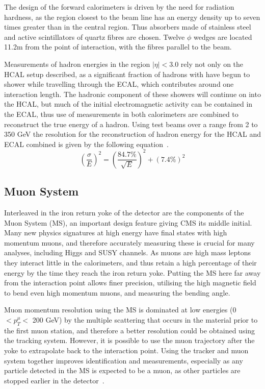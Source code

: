 The design of the forward calorimeters is driven by the need for radiation hardness, as the region closest to the beam line has an energy density up to seven times greater than in the central region. Thus absorbers made of stainless steel and active scintillators of quartz fibres are chosen. Twelve $\phi$ wedges are located 11.2m from the point of interaction, with the fibres parallel to the beam.

Measurements of hadron energies in the region $| \eta| < 3.0$ rely not only on the HCAL setup described, as a significant fraction of hadrons with have begun to shower while travelling through the ECAL, which contributes around one interaction length.  The hadronic component of these showers will continue on into the HCAL, but much of the initial electromagnetic activity can be contained in the ECAL, thus use of measurements in both calorimeters are combined to reconstruct the true energy of a hadron. Using test beams over a range from 2 to 350 GeV the resolution for the reconstruction of hadron energy for the HCAL and ECAL combined is given by the following equation~\cite{HCALTestBeam}.
\begin{equation} 
\left(\frac{\sigma}{E}\right)^2 = \left(\frac{84.7\%}{\sqrt{E}}\right)^2 + \left(7.4\% \right)^2 
\label{eq:H-Res}
\end{equation}


\subsection{Muon System}

Interleaved in the iron return yoke of the detector are the components of the Muon System (MS), an important design feature giving CMS its middle initial. Many new physics signatures at high energy have final states with high momentum muons, and therefore accurately measuring these is crucial for many analyses, including Higgs and SUSY channels. As muons are high mass leptons they interact little in the calorimeters, and thus retain a high percentage of their energy by the time they reach the iron return yoke. Putting the MS here far away from the interaction point allows finer precision, utilising the high magnetic field to bend even high momentum muons, and measuring the bending angle.

Muon momentum resolution using the MS is dominated at low energies (0 $< p^{\mu}_{T} < $ 200 GeV) by the multiple scattering that occurs in the material prior to the first muon station, and therefore a better resolution could be obtained using the tracking system. However, it is possible to use the muon trajectory after the yoke to extrapolate back to the interaction point. Using the tracker and muon system together improves identification and measurements, especially as any particle detected in the MS is expected to be a muon, as other particles are stopped earlier in the detector~\cite{MuonTDR}. 

